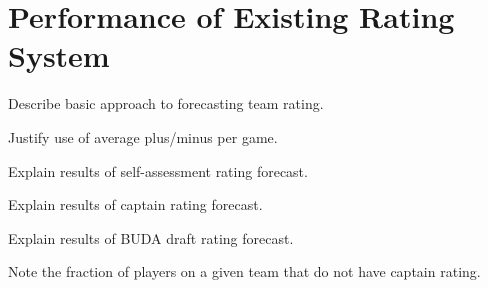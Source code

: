 \section{Performance of Existing Rating System}

Describe basic approach to forecasting team rating.

Justify use of average plus/minus per game.

Explain results of self-assessment rating forecast.

Explain results of captain rating forecast.

Explain results of BUDA draft rating forecast.

Note the fraction of players on a given team that do not have captain rating.